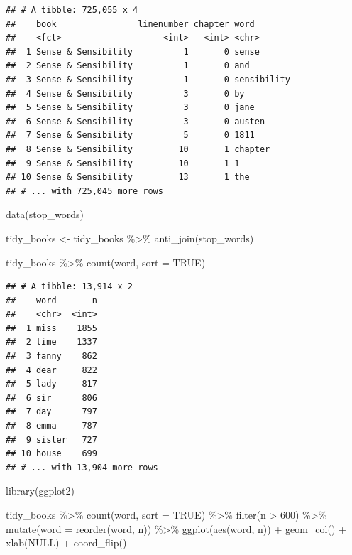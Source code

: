 \documentclass[
]{article}
\newenvironment{Shaded}{\begin{snugshade}}{\end{snugshade}}
\newcommand{\AttributeTok}[1]{\textcolor[rgb]{0.77,0.63,0.00}{#1}}
\newcommand{\ConstantTok}[1]{\textcolor[rgb]{0.00,0.00,0.00}{#1}}
\newcommand{\DecValTok}[1]{\textcolor[rgb]{0.00,0.00,0.81}{#1}}
\newcommand{\FunctionTok}[1]{\textcolor[rgb]{0.00,0.00,0.00}{#1}}
\newcommand{\NormalTok}[1]{#1}
\newcommand{\OtherTok}[1]{\textcolor[rgb]{0.56,0.35,0.01}{#1}}
\newcommand{\SpecialCharTok}[1]{\textcolor[rgb]{0.00,0.00,0.00}{#1}}
\begin{document}
\begin{verbatim}
## # A tibble: 725,055 x 4
##    book                linenumber chapter word       
##    <fct>                    <int>   <int> <chr>      
##  1 Sense & Sensibility          1       0 sense      
##  2 Sense & Sensibility          1       0 and        
##  3 Sense & Sensibility          1       0 sensibility
##  4 Sense & Sensibility          3       0 by         
##  5 Sense & Sensibility          3       0 jane       
##  6 Sense & Sensibility          3       0 austen     
##  7 Sense & Sensibility          5       0 1811       
##  8 Sense & Sensibility         10       1 chapter    
##  9 Sense & Sensibility         10       1 1          
## 10 Sense & Sensibility         13       1 the        
## # ... with 725,045 more rows
\end{verbatim}

\begin{Shaded}
\begin{Highlighting}[]
\FunctionTok{data}\NormalTok{(stop\_words)}

\NormalTok{tidy\_books }\OtherTok{\textless{}{-}}\NormalTok{ tidy\_books }\SpecialCharTok{\%\textgreater{}\%}
  \FunctionTok{anti\_join}\NormalTok{(stop\_words)}
\end{Highlighting}
\end{Shaded}

\begin{Shaded}
\begin{Highlighting}[]
\NormalTok{tidy\_books }\SpecialCharTok{\%\textgreater{}\%}
  \FunctionTok{count}\NormalTok{(word, }\AttributeTok{sort =} \ConstantTok{TRUE}\NormalTok{)}
\end{Highlighting}
\end{Shaded}

\begin{verbatim}
## # A tibble: 13,914 x 2
##    word       n
##    <chr>  <int>
##  1 miss    1855
##  2 time    1337
##  3 fanny    862
##  4 dear     822
##  5 lady     817
##  6 sir      806
##  7 day      797
##  8 emma     787
##  9 sister   727
## 10 house    699
## # ... with 13,904 more rows
\end{verbatim}

\begin{Shaded}
\begin{Highlighting}[]
\FunctionTok{library}\NormalTok{(ggplot2)}

\NormalTok{tidy\_books }\SpecialCharTok{\%\textgreater{}\%}
  \FunctionTok{count}\NormalTok{(word, }\AttributeTok{sort =} \ConstantTok{TRUE}\NormalTok{) }\SpecialCharTok{\%\textgreater{}\%}
  \FunctionTok{filter}\NormalTok{(n }\SpecialCharTok{\textgreater{}} \DecValTok{600}\NormalTok{) }\SpecialCharTok{\%\textgreater{}\%}
  \FunctionTok{mutate}\NormalTok{(}\AttributeTok{word =} \FunctionTok{reorder}\NormalTok{(word, n)) }\SpecialCharTok{\%\textgreater{}\%}
  \FunctionTok{ggplot}\NormalTok{(}\FunctionTok{aes}\NormalTok{(word, n)) }\SpecialCharTok{+}
  \FunctionTok{geom\_col}\NormalTok{() }\SpecialCharTok{+}
  \FunctionTok{xlab}\NormalTok{(}\ConstantTok{NULL}\NormalTok{) }\SpecialCharTok{+}
  \FunctionTok{coord\_flip}\NormalTok{()}
\end{Highlighting}
\end{Shaded}
\end{document}
